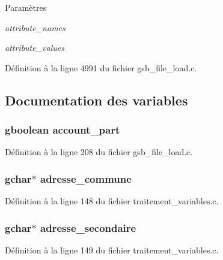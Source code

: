 \begin{DoxyParams}{Paramètres}
\item[{\em attribute\_\-names}]\item[{\em attribute\_\-values}]\end{DoxyParams}


Définition à la ligne 4991 du fichier gsb\_\-file\_\-load.c.



\subsection{Documentation des variables}
\subsubsection[{account\_\-part}]{\setlength{\rightskip}{0pt plus 5cm}gboolean {\bf account\_\-part}}\label{gsb__file__load_8c_a614e01231c829ffc54059d7d1c6f7798}


Définition à la ligne 208 du fichier gsb\_\-file\_\-load.c.

\subsubsection[{adresse\_\-commune}]{\setlength{\rightskip}{0pt plus 5cm}gchar$\ast$ {\bf adresse\_\-commune}}\label{gsb__file__load_8c_ab7ec5b8a1b4dca10b71bfe0364eb7248}


Définition à la ligne 148 du fichier traitement\_\-variables.c.

\subsubsection[{adresse\_\-secondaire}]{\setlength{\rightskip}{0pt plus 5cm}gchar$\ast$ {\bf adresse\_\-secondaire}}\label{gsb__file__load_8c_a5495a13fee46daf1634623fe4e63f99a}


Définition à la ligne 149 du fichier traitement\_\-variables.c.

